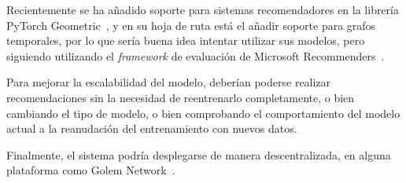 Recientemente se ha añadido soporte para sistemas recomendadores en la librería PyTorch Geometric~\cite{fey_fast_2019}, y en su hoja de ruta está el añadir soporte para grafos temporales, por lo que sería buena idea intentar utilizar sus modelos, pero siguiendo utilizando el \textit{framework} de evaluación de Microsoft Recommenders~\cite{argyriou_microsoft_2020}.

Para mejorar la escalabilidad del modelo, deberían poderse realizar recomendaciones sin la necesidad de reentrenarlo completamente, o bien cambiando el tipo de modelo, o bien comprobando el comportamiento del modelo actual a la reanudación del entrenamiento con nuevos datos.

Finalmente, el sistema podría desplegarse de manera descentralizada, en alguna plataforma como Golem Network~\cite{uriarte_blockchain-based_2018}.

